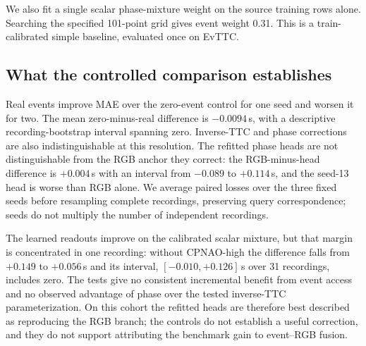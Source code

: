 We also fit a single scalar phase-mixture weight on the source training rows alone. Searching the specified 101-point grid gives event weight 0.31. This is a train-calibrated simple baseline, evaluated once on EvTTC.
\begin{table}[htbp]
\centering\small
\caption{Matched final-head fitting. Values are the mean and sample standard deviation of the three seed-level scores; predictions are not ensembled. The scalar mixture has one fitted coefficient and no seed-dependent optimization.}
\label{tab:revision-heads}
\end{table}

\subsection{What the controlled comparison establishes}
Real events improve MAE over the zero-event control for one seed and worsen it for two. The mean zero-minus-real difference is $-0.0094$\,s, with a descriptive recording-bootstrap interval spanning zero. Inverse-TTC and phase corrections are also indistinguishable at this resolution. The refitted phase heads are not distinguishable from the RGB anchor they correct: the RGB-minus-head difference is $+0.004$\,s with an interval from $-0.089$ to $+0.114$\,s, and the seed-13 head is worse than RGB alone. We average paired losses over the three fixed seeds before resampling complete recordings, preserving query correspondence; seeds do not multiply the number of independent recordings.
\begin{table}[htbp]
\centering\small
\caption{Paired differences after averaging query losses over fixed head seeds; 10,000 complete-recording resamples across 32 recordings, or 31 for the row without CPNAO-high. ``Phase'' denotes the three-seed refitted phase head with real events. These intervals describe the inspected cohort and condition on the shared upstream models.}
\label{tab:revision-paired}
\end{table}

The learned readouts improve on the calibrated scalar mixture, but that margin is concentrated in one recording: without CPNAO-high the difference falls from $+0.149$ to $+0.056$\,s and its interval, $[-0.010,+0.126]$\,s over 31 recordings, includes zero. The tests give no consistent incremental benefit from event access and no observed advantage of phase over the tested inverse-TTC parameterization. On this cohort the refitted heads are therefore best described as reproducing the RGB branch; the controls do not establish a useful correction, and they do not support attributing the benchmark gain to event--RGB fusion.


